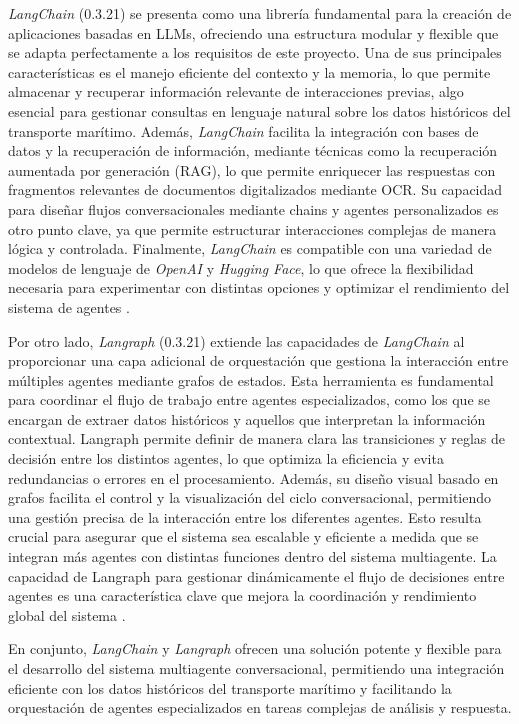 \textit{LangChain} (0.3.21) se presenta como una librería fundamental para la creación de aplicaciones basadas en LLMs, ofreciendo una estructura modular y flexible que se adapta perfectamente a los requisitos de este proyecto. Una de sus principales características es el manejo eficiente del contexto y la memoria, lo que permite almacenar y recuperar información relevante de interacciones previas, algo esencial para gestionar consultas en lenguaje natural sobre los datos históricos del transporte marítimo. Además, \textit{LangChain} facilita la integración con bases de datos y la recuperación de información, mediante técnicas como la recuperación aumentada por generación (RAG), lo que permite enriquecer las respuestas con fragmentos relevantes de documentos digitalizados mediante OCR. Su capacidad para diseñar flujos conversacionales mediante chains y agentes personalizados es otro punto clave, ya que permite estructurar interacciones complejas de manera lógica y controlada. Finalmente, \textit{LangChain} es compatible con una variedad de modelos de lenguaje de \textit{OpenAI} y \textit{Hugging Face}, lo que ofrece la flexibilidad necesaria para experimentar con distintas opciones y optimizar el rendimiento del sistema de agentes \cite{langchain2023docs}.

Por otro lado, \textit{Langraph} (0.3.21) extiende las capacidades de \textit{LangChain} al proporcionar una capa adicional de orquestación que gestiona la interacción entre múltiples agentes mediante grafos de estados. Esta herramienta es fundamental para coordinar el flujo de trabajo entre agentes especializados, como los que se encargan de extraer datos históricos y aquellos que interpretan la información contextual. Langraph permite definir de manera clara las transiciones y reglas de decisión entre los distintos agentes, lo que optimiza la eficiencia y evita redundancias o errores en el procesamiento. Además, su diseño visual basado en grafos facilita el control y la visualización del ciclo conversacional, permitiendo una gestión precisa de la interacción entre los diferentes agentes. Esto resulta crucial para asegurar que el sistema sea escalable y eficiente a medida que se integran más agentes con distintas funciones dentro del sistema multiagente. La capacidad de Langraph para gestionar dinámicamente el flujo de decisiones entre agentes es una característica clave que mejora la coordinación y rendimiento global del sistema \cite{langraph2023}.

En conjunto, \textit{LangChain} y \textit{Langraph} ofrecen una solución potente y flexible para el desarrollo del sistema multiagente conversacional, permitiendo una integración eficiente con los datos históricos del transporte marítimo y facilitando la orquestación de agentes especializados en tareas complejas de análisis y respuesta.

